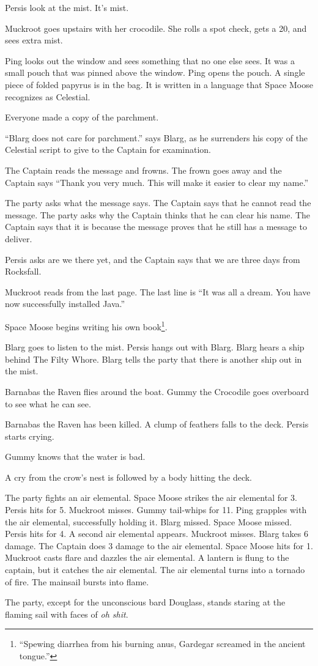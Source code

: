 \documentclass{article}
\begin{document}
Persis look at the mist. It's mist. 

Muckroot goes upstairs with her crocodile. She rolls a spot check, gets a 20, and sees extra mist.

Ping looks out the window and sees something that no one else sees. It was a small pouch that was pinned above the window. Ping opens the pouch. A single piece of folded papyrus is in the bag. It is written in a language that Space Moose recognizes as Celestial.

Everyone made a copy of the parchment.

``Blarg does not care for parchment.'' says Blarg, as he surrenders his copy of the Celestial script to give to the Captain for examination.

The Captain reads the message and frowns. The frown goes away and the Captain says ``Thank you very much. This will make it easier to clear my name.''

The party asks what the message says. The Captain says that he cannot read the message. The party asks why the Captain thinks that he can clear his name. The Captain says that it is because the message proves that he still has a message to deliver.

Persis asks are we there yet, and the Captain says that we are three days from Rocksfall.

Muckroot reads from the last page. The last line is ``It was all a dream. You have now successfully installed Java.''

Space Moose begins writing his own book\footnote{``Spewing diarrhea from his burning anus, Gardegar screamed in the ancient tongue.''}.

Blarg goes to listen to the mist. Persis hangs out with Blarg. Blarg hears a ship behind The Filty Whore. Blarg tells the party that there is another ship out in the mist.

Barnabas the Raven flies around the boat. Gummy the Crocodile goes overboard to see what he can see.

Barnabas the Raven has been killed. A clump of feathers falls to the deck. Persis starts crying.

Gummy knows that the water is bad.

A cry from the crow's nest is followed by a body hitting the deck.

The party fights an air elemental. Space Moose strikes the air elemental for 3. Persis hits for 5. Muckroot misses. Gummy tail-whips for 11. Ping grapples with the air elemental, successfully holding it. Blarg missed. Space Moose missed. Persis hits for 4. A second air elemental appears. Muckroot misses. Blarg takes 6 damage. The Captain does 3 damage to the air elemental. Space Moose hits for 1. Muckroot casts flare and dazzles the air elemental. A lantern is flung to the captain, but it catches the air elemental. The air elemental turns into a tornado of fire. The mainsail bursts into flame.

The party, except for the unconscious bard Douglass, stands staring at the flaming sail with faces of \textit{oh shit}.
\end{document}

